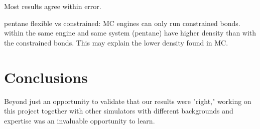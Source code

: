 Most results agree within error.

pentane flexible vs constrained: MC engines can only run constrained bonds. within the same engine and same system (pentane) have higher density than with the constrained bonds. This may explain the lower density found in MC.


\section{Conclusions}
Beyond just an opportunity to validate that our results were "right," working on this project together with other simulators with different backgrounds and expertise was an invaluable opportunity to learn.

